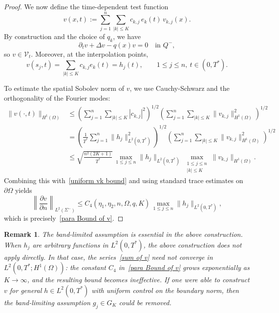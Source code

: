 \documentclass[12pt]{amsart}
\newtheorem{remark}{Remark}
\begin{document}
\begin{proof}
    We now define the time-dependent test function
    \begin{equation}\label{sum of v}
        v(x,t) := \sum_{j=1}^n \sum_{|k| \leq K} c_{k,j}\, e_k(t)\, v_{k,j}(x).
    \end{equation}
    By construction and the choice of \(q_k\), we have
    \[
    \partial_t v + \Delta v - q(x)v = 0 \quad \text{in } Q^{-},
    \]
    so \(v\in\mathcal{V}_t\). Moreover, at the interpolation points,
    \[
    v(s_j,t) 
        = \sum_{|k|\le K} c_{k,j} e_k(t)
        = h_j(t), \qquad 1\le j\le n,\ t\in(0,T^*).
    \]

    To estimate the spatial Sobolev norm of \(v\), we use Cauchy-Schwarz and the orthogonality of the Fourier modes:
    \begin{align*}
    \|v(\cdot,t)\|_{H^1(\Omega)} 
    &\le \left( \sum_{j=1}^{n} \sum_{|k| \leq K} |c_{k,j}|^2 \right)^{1/2}
        \left( \sum_{j=1}^{n} \sum_{|k| \leq K} \|v_{k,j}\|^2_{H^1(\Omega)} \right)^{1/2} \\
    &= \left( \frac{1}{T^*} \sum_{j=1}^n \|h_j\|^2_{L^2(0,T^*)} \right)^{1/2}
        \left( \sum_{j=1}^n \sum_{|k| \leq K} \|v_{k,j}\|^2_{H^1(\Omega)} \right)^{1/2} \\
    &\leq \sqrt{\frac{n^2 (2K+1)}{T^*}}\,
        \max_{1\le j\le n}\|h_j\|_{L^2(0,T^*)}\,
        \max_{\substack{1 \leq j \leq n \\ |k| \leq K}} \|v_{k,j}\|_{H^1(\Omega)}.
    \end{align*}
    Combining this with~\eqref{uniform vk bound} and using standard trace estimates on \(\partial\Omega\) yields
    \[
    \left\| \frac{\partial v}{\partial n} \right\|_{L^2(\Sigma^-)}
        \le C_4(\eta_1,\eta_2,n,\Omega,q,K)\,
            \max_{1\le j\le n}\|h_j\|_{L^2(0,T^*)},
    \]
    which is precisely~\eqref{para Bound of v}.
\end{proof}

\begin{remark}
    The band-limited assumption is essential in the above construction.
    When \(h_j\) are arbitrary functions in \(L^2(0,T^*)\), the above construction does not apply directly. In that case, the series~\eqref{sum of v} need not converge in \(L^2(0,T^*;H^1(\Omega))\): the constant \(C_4\) in~\eqref{para Bound of v} grows exponentially as \(K\to\infty\), and the resulting bound becomes ineffective.  
    If one were able to construct \(v\) for general \(h\in L^2(0,T^*)\) with uniform control on the boundary norm, then the band-limiting assumption \(g_j\in G_K\) could be removed.
\end{remark}
\end{document}
